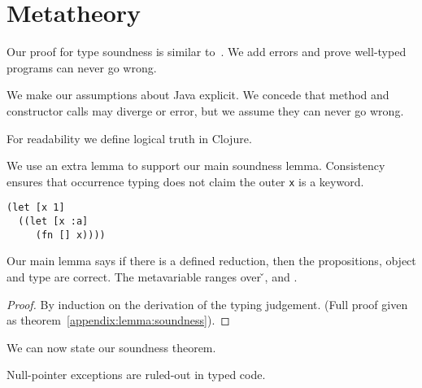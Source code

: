 \section{Metatheory}

Our proof for type soundness is similar to~\cite{TF10}. We add
errors and prove well-typed programs can never go wrong.

We make our assumptions about Java explicit. We concede that
method and constructor calls may diverge or error, but we assume they can
never go wrong.

{}

For readability we define logical truth in Clojure.

{}

We use an extra lemma to support our main soundness lemma. Consistency
ensures that occurrence typing does not claim the outer 
\texttt{x} is a keyword. 

\begin{verbatim}
(let [x 1]
  ((let [x :a]
     (fn [] x))))
\end{verbatim}

{}

Our main lemma says if there is a defined reduction, then the propositions, object
and type are correct.
The metavariable  ranges over \v{}, \errorvalv{} and \wrong{}.

\begin{lemma}\label{main:lemma:soundness}

  {\soundnesslemmahypothesis}
  \begin{proof}
    By induction on the derivation of the typing judgement. 
    (Full proof given as theorem~\ref{appendix:lemma:soundness}).

  \end{proof}
\end{lemma}


We can now state our soundness theorem.

{}

{}

Null-pointer exceptions are ruled-out in typed code.

{}
